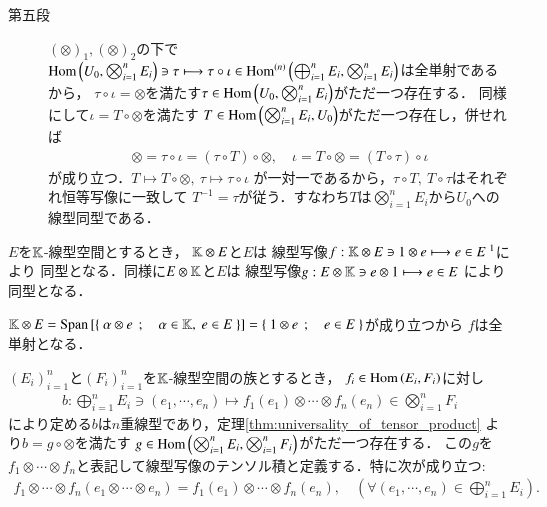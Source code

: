 \begin{prf}
\begin{description}
			\item[第五段]
				$(\otimes)_1,(\otimes)_2$の下で
				$\Hom{U_0}{\bigotimes_{i=1}^n E_i} \ni \tau \longmapsto \tau \circ \iota \in \Ln{\bigoplus_{i=1}^n E_i}{\bigotimes_{i=1}^n E_i}{n}$は全単射であるから，
				$\tau \circ \iota = \otimes$を満たす$\tau \in \Hom{U_0}{\bigotimes_{i=1}^n E_i}$がただ一つ存在する．
				同様にして$\iota = T \circ \otimes$を満たす
				$T \in \Hom{\bigotimes_{i=1}^n E_i}{U_0}$がただ一つ存在し，併せれば
				\begin{align}
					\otimes = \tau \circ \iota = (\tau \circ T) \circ \otimes,
					\quad \iota = T \circ \otimes = (T \circ \tau) \circ \iota
				\end{align}
				が成り立つ．$T \longmapsto T \circ \otimes,\ \tau \longmapsto \tau \circ \iota$
				が一対一であるから，$\tau \circ T,\ T \circ \tau$はそれぞれ恒等写像に一致して
				$T^{-1} = \tau$が従う．すなわち$T$は$\bigotimes_{i=1}^n E_i$から$U_0$への
				線型同型である．
				\QED
		\end{description}
	\end{prf}
	
	\begin{screen}
		\begin{thm}[スカラーとのテンソル積]\label{thm:tensor_product_with_scalar}
			$E$を$\K$-線型空間とするとき，
			$\K \otimes E$と$E$は
			線型写像$f:\K \otimes E \ni 1 \otimes e \longmapsto e \in E\ \footnotemark
			$により
			同型となる．同様に$E \otimes \K$と$E$は
			線型写像$g:E \otimes \K \ni e \otimes 1 \longmapsto e \in E$
			により同型となる．
		\end{thm}
	\end{screen}
	\footnotetext{
		1は$\K$の単位元を表す．
	}
	\begin{prf}
		$\K \otimes E = \Span{\Set{\alpha \otimes e}{\alpha \in \K,\ e \in E}} 
		= \Set{1 \otimes e}{e \in E}$が成り立つから
		$f$は全単射となる．
		\QED
	\end{prf}
	
	\begin{screen}
		\begin{dfn}[線型写像のテンソル積]\label{def:tensor_products_of_linear_maps}
				$(E_i)_{i=1}^n$と$(F_i)_{i=1}^n$を$\K$-線型空間の族とするとき，
				$f_i \in \Hom{E_i}{F_i}$に対し
				\begin{align}
					b: \bigoplus_{i=1}^n E_i \ni (e_1,\cdots,e_n)
					\longmapsto f_1(e_1)\otimes \cdots \otimes f_n(e_n)
					\in \bigotimes_{i=1}^n F_i
				\end{align}
				により定める$b$は$n$重線型であり，定理\ref{thm:universality_of_tensor_product}
				より$b = g \circ \otimes$を満たす
				$g \in \Hom{\bigotimes_{i=1}^{n} E_i}{\bigotimes_{i=1}^{n} F_i}$がただ一つ存在する．
				この$g$を$f_1 \otimes \cdots \otimes f_n$と表記して線型写像のテンソル積と定義する．特に次が成り立つ:
				\begin{align}
					f_1 \otimes \cdots \otimes f_n(e_1 \otimes \cdots \otimes e_n)
					= f_1(e_1)\otimes \cdots \otimes f_n(e_n),
					\quad (\forall (e_1,\cdots,e_n) \in \bigoplus_{i=1}^n E_i).
				\end{align}
		\end{dfn}
	\end{screen}
	
